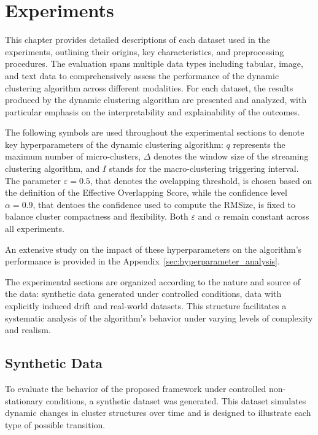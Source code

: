 \chapter{Experiments}\label{ch:experiments}
This chapter provides detailed descriptions of each dataset used in the
experiments, outlining their origins, key characteristics, and preprocessing
procedures. The evaluation spans multiple data types including tabular, image,
and text data to comprehensively assess the performance of the dynamic
clustering algorithm across different modalities. For each dataset, the results
produced by the dynamic clustering algorithm are presented and analyzed, with
particular emphasis on the interpretability and explainability of the outcomes.

The following symbols are used throughout the experimental sections to denote
key hyperparameters of the dynamic clustering algorithm: $q$ represents the
maximum number of micro-clusters, $\Delta$ denotes the window size of the
streaming clustering algorithm, and $I$ stands for the macro-clustering
triggering interval. The parameter $\varepsilon = 0.5$, that denotes the
ovelapping threshold, is chosen based on the definition of the Effective
Overlapping Score, while the confidence level $\alpha = 0.9$, that dentoes the
confidence used to compute the RMSize, is fixed to balance cluster compactness
and flexibility. Both $\varepsilon$ and $\alpha$ remain constant across all
experiments.

An extensive study on the impact of these hyperparameters on the algorithm's
performance is provided in the Appendix~\ref{sec:hyperparameter_analysis}.

The experimental sections are organized according to the nature and source of
the data: synthetic data generated under controlled conditions, data with
explicitly induced drift and real-world datasets. This structure facilitates a
systematic analysis of the algorithm's behavior under varying levels of
complexity and realism.

\section{Synthetic Data}\label{sec:sythetic_data}

To evaluate the behavior of the proposed framework under controlled
non-stationary conditions, a synthetic dataset was generated. This dataset
simulates dynamic changes in cluster structures over time and is designed to
illustrate each type of possible transition.

